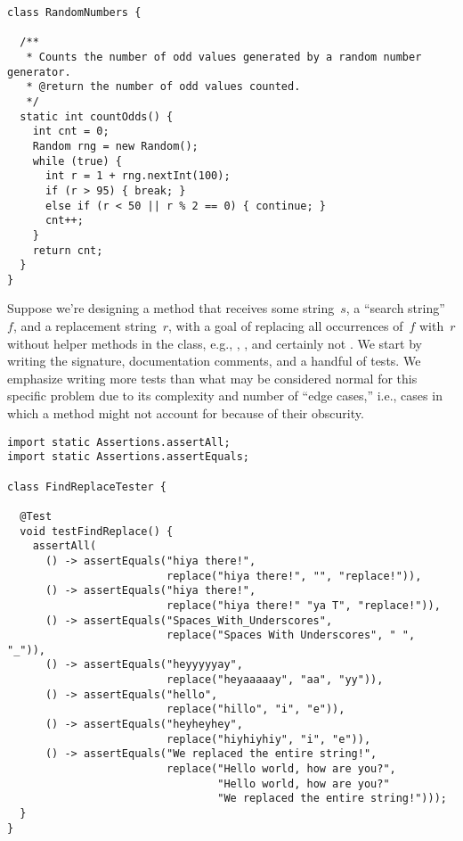 \begin{lstlisting}[language=MyJava]
class RandomNumbers {

  /**
   * Counts the number of odd values generated by a random number generator.
   * @return the number of odd values counted.
   */
  static int countOdds() {
    int cnt = 0;
    Random rng = new Random();
    while (true) {
      int r = 1 + rng.nextInt(100);
      if (r > 95) { break; }
      else if (r < 50 || r % 2 == 0) { continue; }
      cnt++;
    }
    return cnt;
  }
}
\end{lstlisting}

Suppose we're designing a method that receives some string~$s$, a ``search string''~$f$, and a replacement string~$r$, with a goal of replacing all occurrences of~$f$ with~$r$ without helper methods in the  class, e.g., , , and certainly not . 
We start by writing the signature, documentation comments, and a handful of tests. 
We emphasize writing more tests than what may be considered normal for this specific problem due to its complexity and number of ``edge cases,'' i.e., cases in which a method might not account for because of their obscurity.

\begin{lstlisting}[language=MyJava]
import static Assertions.assertAll;
import static Assertions.assertEquals;

class FindReplaceTester {

  @Test
  void testFindReplace() {
    assertAll(
      () -> assertEquals("hiya there!",
                         replace("hiya there!", "", "replace!")),
      () -> assertEquals("hiya there!",
                         replace("hiya there!" "ya T", "replace!")),
      () -> assertEquals("Spaces_With_Underscores",
                         replace("Spaces With Underscores", " ", "_")),
      () -> assertEquals("heyyyyyay",
                         replace("heyaaaaay", "aa", "yy")),
      () -> assertEquals("hello",
                         replace("hillo", "i", "e")),
      () -> assertEquals("heyheyhey",
                         replace("hiyhiyhiy", "i", "e")),
      () -> assertEquals("We replaced the entire string!",
                         replace("Hello world, how are you?", 
                                 "Hello world, how are you?" 
                                 "We replaced the entire string!")));
  }
}
\end{lstlisting}

